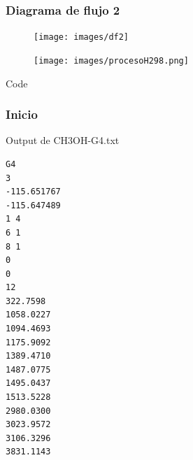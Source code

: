 \documentclass{beamer}
\begin{document}
\begin{frame}
\frametitle{Diagrama de flujo 2}
\begin{center}
\begin{figure}[h!]
\texttt{[image: images/df2]}
\end{figure}
\end{center}
\end{frame}
\begin{frame}

\begin{center}
\begin{figure}[h]
\texttt{[image: images/procesoH298.png]}
\end{figure}
\end{center}
\end{frame}
\begin{frame}[fragile]{Code}
\frametitle{Inicio}

\begin{block}{Output de CH3OH-G4.txt}
\begin{lstlisting}
G4
3
-115.651767
-115.647489
1 4
6 1
8 1
0
0
12
322.7598
1058.0227
1094.4693
1175.9092
1389.4710
1487.0775
1495.0437
1513.5228
2980.0300
3023.9572
3106.3296
3831.1143
\end{lstlisting}
\end{block}
\end{frame}
\end{document}
